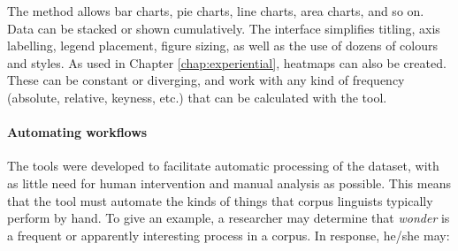 The method allows bar charts, pie charts, line charts, area charts, and so on. Data can be stacked or shown cumulatively. The interface simplifies titling, axis labelling, legend placement, figure sizing, as well as the use of dozens of colours and styles. As used in Chapter \ref{chap:experiential}, heatmaps can also be created. These can be constant or diverging, and work with any kind of frequency (absolute, relative, keyness, etc.) that can be calculated with the tool.




\paragraph{Automating workflows}

The tools were developed to facilitate automatic processing of the dataset, with as little need for human intervention and manual analysis as possible. This means that the tool must automate the kinds of things that corpus linguists typically perform by hand. To give an example, a researcher may determine that \emph{wonder} is a frequent or apparently interesting process in a \gls{corpus}. In response, he\slash she may:


